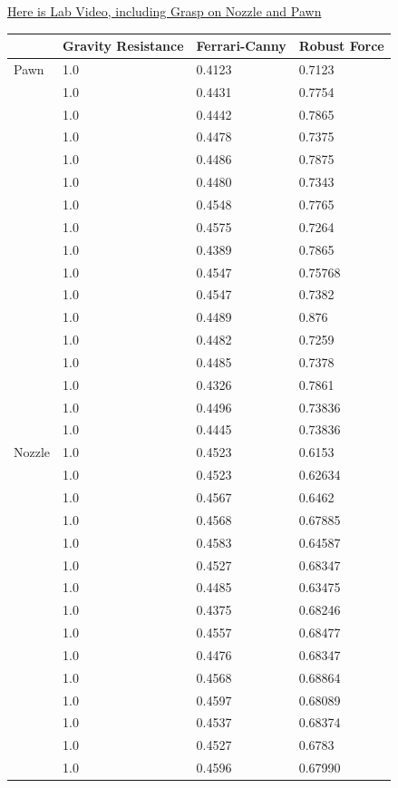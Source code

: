 \documentclass{article}
\begin{document}
\begin{multicols}{2}
\href{https://drive.google.com/file/d/1GXad7t8-8eQQp-zyBbwTg42D6n97q5GY/view?usp=drive_link}{ Here is Lab Video, including Grasp on Nozzle and Pawn}
\begin{center}
\begin{tabular}{ | m{1.5cm} | m{1.5cm}| m{1.5cm}| m{1.5cm}|  } 
\hline
&Gravity Resistance & Ferrari-Canny & Robust Force\\
\hline
Pawn & 1.0 &  0.4123 & 0.7123\\
\hline
 & 1.0 &  0.4431 & 0.7754\\
\hline
 & 1.0 &  0.4442 & 0.7865\\
\hline
 & 1.0 &  0.4478 & 0.7375\\
\hline
 & 1.0 &  0.4486 & 0.7875\\
\hline
 & 1.0 &  0.4480 & 0.7343\\
\hline
 & 1.0 &  0.4548 & 0.7765\\
\hline
 & 1.0 &  0.4575& 0.7264\\
\hline
 & 1.0 &  0.4389& 0.7865\\
\hline
 & 1.0 &  0.4547 & 0.75768\\
\hline
  & 1.0 &  0.4547 & 0.7382\\
\hline
  & 1.0 &  0.4489 & 0.876\\
\hline
  & 1.0 &  0.4482 & 0.7259\\
\hline
  & 1.0 &  0.4485 & 0.7378\\
\hline
   & 1.0 &  0.4326 & 0.7861\\
\hline
  & 1.0 &  0.4496 & 0.73836\\
\hline
  & 1.0 &  0.4445 & 0.73836\\
\hline
Nozzle & 1.0 & 0.4523 & 0.6153 \\
 \hline
  & 1.0 & 0.4523 & 0.62634 \\
 \hline
  & 1.0 & 0.4567 & 0.6462 \\
 \hline
  & 1.0 & 0.4568& 0.67885 \\
 \hline
  & 1.0 & 0.4583 & 0.64587 \\
 \hline
  & 1.0 & 0.4527 & 0.68347 \\
 \hline
  & 1.0 & 0.4485 & 0.63475 \\
 \hline
  & 1.0 & 0.4375 & 0.68246\\
 \hline
  & 1.0 & 0.4557 & 0.68477 \\
 \hline
  & 1.0 & 0.4476 & 0.68347 \\
 \hline
  & 1.0 & 0.4568 & 0.68864 \\
 \hline
  & 1.0 & 0.4597 & 0.68089 \\
 \hline
  & 1.0 & 0.4537 & 0.68374 \\
 \hline
  & 1.0 & 0.4527 & 0.6783 \\
 \hline
  & 1.0 & 0.4596 & 0.67990 \\
 \hline


\end{tabular}
\end{center}
\end{multicols}
\end{document}
